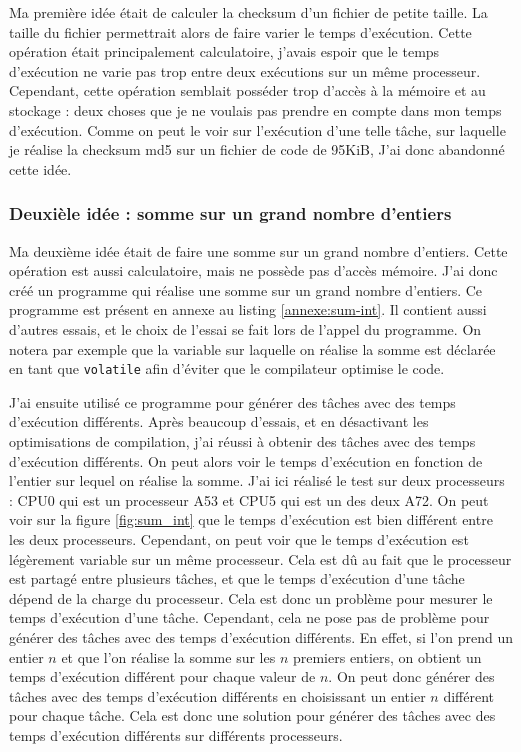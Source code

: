Ma première idée était de calculer la checksum d'un fichier de petite taille. La taille du fichier permettrait alors de faire varier le temps d'exécution. Cette opération était principalement calculatoire, j'avais espoir que le temps d'exécution ne varie pas trop entre deux exécutions sur un même processeur. Cependant, cette opération semblait posséder trop d'accès à la mémoire et au stockage : deux choses que je ne voulais pas prendre en compte dans mon temps d'exécution. Comme on peut le voir sur l'exécution d'une telle tâche, sur laquelle je réalise la \gls{checksum md5} sur un fichier de code de 95KiB, J'ai donc abandonné cette idée.

\subsubsection{Deuxièle idée : somme sur un grand nombre d'entiers}

Ma deuxième idée était de faire une somme sur un grand nombre d'entiers. Cette opération est aussi calculatoire, mais ne possède pas d'accès mémoire. J'ai donc créé un programme qui réalise une somme sur un grand nombre d'entiers. Ce programme est présent en annexe au listing \ref{annexe:sum-int}. Il contient aussi d'autres essais, et le choix de l'essai se fait lors de l'appel du programme. On notera par exemple que la variable sur laquelle on réalise la somme est déclarée en tant que \texttt{volatile} afin d'éviter que le compilateur optimise le code.

J'ai ensuite utilisé ce programme pour générer des tâches avec des temps d'exécution différents. Après beaucoup d'essais, et en désactivant les optimisations de compilation, j'ai réussi à obtenir des tâches avec des temps d'exécution différents. On peut alors voir le temps d'exécution en fonction de l'entier sur lequel on réalise la somme. J'ai ici réalisé le test sur deux processeurs : CPU0 qui est un processeur A53 et CPU5 qui est un des deux A72. On peut voir sur la figure \ref{fig:sum_int} que le temps d'exécution est bien différent entre les deux processeurs. Cependant, on peut voir que le temps d'exécution est légèrement variable sur un même processeur. Cela est dû au fait que le processeur est partagé entre plusieurs tâches, et que le temps d'exécution d'une tâche dépend de la charge du processeur. Cela est donc un problème pour mesurer le temps d'exécution d'une tâche. Cependant, cela ne pose pas de problème pour générer des tâches avec des temps d'exécution différents. En effet, si l'on prend un entier $n$ et que l'on réalise la somme sur les $n$ premiers entiers, on obtient un temps d'exécution différent pour chaque valeur de $n$. On peut donc générer des tâches avec des temps d'exécution différents en choisissant un entier $n$ différent pour chaque tâche. Cela est donc une solution pour générer des tâches avec des temps d'exécution différents sur différents processeurs.


